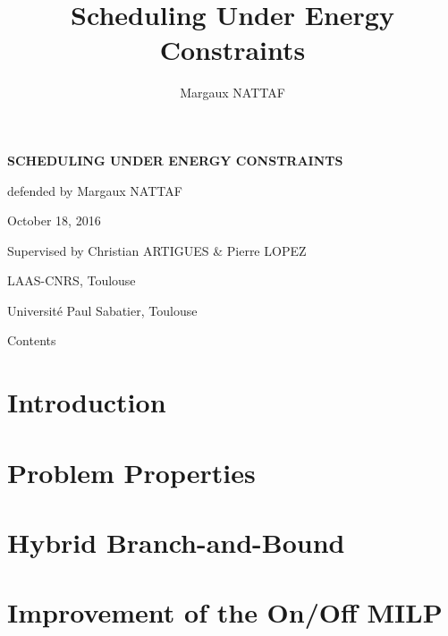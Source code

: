 \documentclass{beamer}
\title{Scheduling Under Energy Constraints}
\author{Margaux NATTAF}
\institute{LAAS-CNRS Toulouse

  Université Paul Sabatier Toulouse}
\begin{document}
{\canvasspecial
  \begin{frame}
    \vspace{1.5cm}
    \begin{flushleft}
      {\Large \bf \color{bleuLAAS}SCHEDULING UNDER ENERGY CONSTRAINTS}
      
      \vspace{0.3cm}
      \small \color{bleuLAAS!90} defended by Margaux NATTAF

      October 18, 2016
    \end{flushleft}
    \vspace{0.5cm}

    {\footnotesize  \color{bleuLAAS!80}
      Supervised by Christian ARTIGUES \& Pierre LOPEZ}

    \vspace{1.5cm}
    \begin{flushright} \color{bleuLAAS!70}
      \scriptsize LAAS-CNRS, Toulouse

      Université Paul Sabatier, Toulouse
    \end{flushright}
  \end{frame}}

\setcounter{tocdepth}{1}
\begin{frame}{Contents}
 \tableofcontents
\end{frame}

\setcounter{framenumber}{0}

\section{Introduction}


\setcounter{tocdepth}{2}
\section{Problem Properties}

\section{Hybrid Branch-and-Bound}


\section{Improvement of the On/Off MILP}

\end{document}
